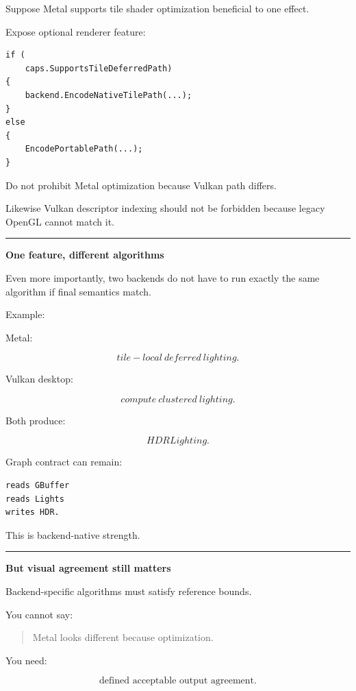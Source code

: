 Suppose Metal supports tile shader optimization beneficial to one effect.

Expose optional renderer feature:

\begin{verbatim}
if (
    caps.SupportsTileDeferredPath)
{
    backend.EncodeNativeTilePath(...);
}
else
{
    EncodePortablePath(...);
}
\end{verbatim}

Do not prohibit Metal optimization because Vulkan path differs.

Likewise Vulkan descriptor indexing should not be forbidden because legacy OpenGL cannot match it.

\begin{center}\rule{0.5\linewidth}{0.5pt}\end{center}

\textbf{One feature, different algorithms}

Even more importantly, two backends do not have to run exactly the same algorithm if final semantics match.

Example:

Metal:

\[
tile-local\ deferred\ lighting.
\]

Vulkan desktop:

\[
compute\ clustered\ lighting.
\]

Both produce:

\[
HDRLighting.
\]

Graph contract can remain:

\begin{verbatim}
reads GBuffer
reads Lights
writes HDR.
\end{verbatim}

This is backend-native strength.

\begin{center}\rule{0.5\linewidth}{0.5pt}\end{center}

\textbf{But visual agreement still matters}

Backend-specific algorithms must satisfy reference bounds.

You cannot say:

\begin{quote}
Metal looks different because optimization.
\end{quote}

You need:

\[
\boxed{
\text{defined acceptable output agreement}.
}
\]

